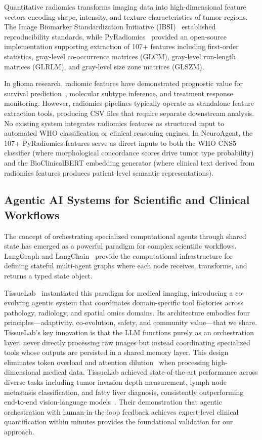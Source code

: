Quantitative radiomics transforms imaging data into high-dimensional feature vectors encoding shape, intensity, and texture characteristics of tumor regions. The Image Biomarker Standardization Initiative (IBSI)~\cite{zwanenburg2020ibsi} established reproducibility standards, while PyRadiomics~\cite{vangriethuysen2017radiomics} provided an open-source implementation supporting extraction of 107+ features including first-order statistics, gray-level co-occurrence matrices (GLCM), gray-level run-length matrices (GLRLM), and gray-level size zone matrices (GLSZM).

In glioma research, radiomic features have demonstrated prognostic value for survival prediction~\cite{kickingereder2016radiomic}, molecular subtype inference, and treatment response monitoring. However, radiomics pipelines typically operate as standalone feature extraction tools, producing CSV files that require separate downstream analysis. No existing system integrates radiomics features as structured input to automated WHO classification or clinical reasoning engines. In NeuroAgent, the 107+ PyRadiomics features serve as direct inputs to both the WHO CNS5 classifier (where morphological concordance scores drive tumor type probability) and the BioClinicalBERT embedding generator (where clinical text derived from radiomics features produces patient-level semantic representations).

\subsection{Agentic AI Systems for Scientific and Clinical Workflows}

The concept of orchestrating specialized computational agents through shared state has emerged as a powerful paradigm for complex scientific workflows. LangGraph and LangChain~\cite{langgraph2024} provide the computational infrastructure for defining stateful multi-agent graphs where each node receives, transforms, and returns a typed state object.

TissueLab~\cite{tissuelab2025} instantiated this paradigm for medical imaging, introducing a co-evolving agentic system that coordinates domain-specific tool factories across pathology, radiology, and spatial omics domains. Its architecture embodies four principles---adaptivity, co-evolution, safety, and community value---that we share. TissueLab's key innovation is that the LLM functions purely as an orchestration layer, never directly processing raw images but instead coordinating specialized tools whose outputs are persisted in a shared memory layer. This design eliminates token overload and attention dilution~\cite{liu2024lost} when processing high-dimensional medical data. TissueLab achieved state-of-the-art performance across diverse tasks including tumor invasion depth measurement, lymph node metastasis classification, and fatty liver diagnosis, consistently outperforming end-to-end vision-language models~\cite{tissuelab2025}. Their demonstration that agentic orchestration with human-in-the-loop feedback achieves expert-level clinical quantification within minutes provides the foundational validation for our approach.

